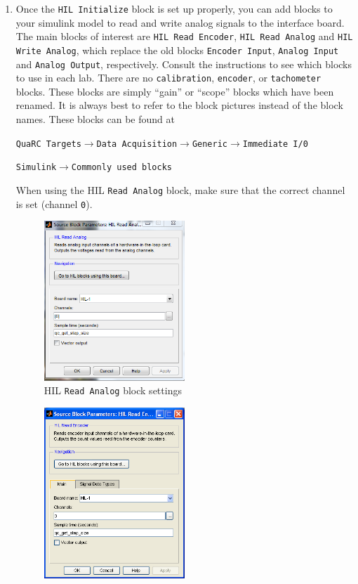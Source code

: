 \begin{enumerate}
\item Once the \verb|HIL Initialize| block is set up properly, you can add
blocks to your simulink model to read and write analog signals to the
interface board.  The main blocks of interest are \verb|HIL Read Encoder|,
\verb|HIL Read Analog| and \verb|HIL Write Analog|, which replace the old
blocks \verb|Encoder Input|, \verb|Analog Input| and \verb|Analog Output|,
respectively.  Consult the instructions to see which blocks to use in each
lab. There are no \verb|calibration|, \verb|encoder|, or \verb|tachometer|
blocks.  These blocks are simply ``gain'' or ``scope'' blocks which have been
renamed.  It is always best to refer to the block pictures instead of the
block names.  These blocks can be found at
\begin{center}
\verb|QuaRC Targets|$\to$\verb|Data Acquisition|$\to$\verb|Generic|$\to$\verb|Immediate I/0|
\end{center}
\begin{center}
\verb|Simulink|$\to$\verb|Commonly used blocks|
\end{center}
When using the HIL \verb|Read Analog| block, make sure that the correct
channel is set (channel \verb|0|).
\begin{figure}[htbp]
\centering
\includegraphics[width=0.5\textwidth]{pix/hil-read-analog-block.PNG}
\caption{HIL \texttt{Read Analog} block settings}\label{fig:hilrab}
\end{figure}
\begin{figure}[htbp]
\centering
\includegraphics[width=0.5\textwidth]{pix/hil-read-encoder-block.PNG}

\end{figure}
\end{enumerate}
